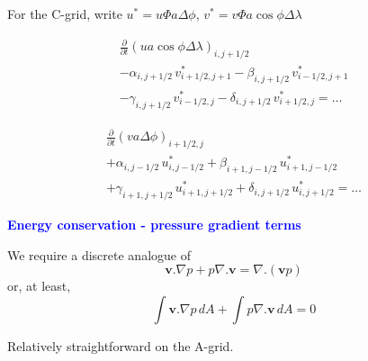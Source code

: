 \documentclass[a4]{seminar}
\newcommand{\B}[1]{\textcolor{blue}{#1}}
\begin{document}

\begin{slide}

For the C-grid, write \( u^{\mathrm{*}} = u \Phi a \Delta \phi \),
\( v^{\mathrm{*}} = v \Phi a \cos \phi \Delta \lambda \)

\begin{displaymath}
\begin{array}{l}
\frac{\partial }{\partial t}( u a \cos \phi \Delta \lambda )_{i,j+1/2} \\
- \alpha_{i,j+1/2} \, v^{\mathrm{*}}_{i+1/2,j+1}
-  \beta_{i,j+1/2} \, v^{\mathrm{*}}_{i-1/2,j+1} \\
- \gamma_{i,j+1/2} \, v^{\mathrm{*}}_{i-1/2,j}
- \delta_{i,j+1/2} \, v^{\mathrm{*}}_{i+1/2,j} = \ldots
\end{array}
\end{displaymath}

\begin{displaymath}
\begin{array}{l}
\frac{\partial }{\partial t}( v a \Delta \phi )_{i+1/2,j} \\
+ \alpha_{i,j-1/2} \, u^{\mathrm{*}}_{i,j-1/2}
+ \beta_{i+1,j-1/2} \, u^{\mathrm{*}}_{i+1,j-1/2} \\
+ \gamma_{i+1,j+1/2} \, u^{\mathrm{*}}_{i+1,j+1/2}
+ \delta_{i,j+1/2} \, u^{\mathrm{*}}_{i,j+1/2} = \ldots
\end{array}
\end{displaymath}



\end{slide}


\begin{slide}

\B{\bf Energy conservation - pressure gradient terms}

\vspace{2mm}

We require a discrete analogue of
\begin{displaymath}
\mathbf{v} . \nabla p + p \nabla . \mathbf{v} = \nabla . (\mathbf{v} p)
\end{displaymath}
or, at least,
\begin{displaymath}
\int \mathbf{v} . \nabla p \, dA + \int p \nabla . \mathbf{v} \, dA = 0
\end{displaymath}

\vspace{2mm}

Relatively straightforward on the A-grid.


\end{slide}
\end{document}
